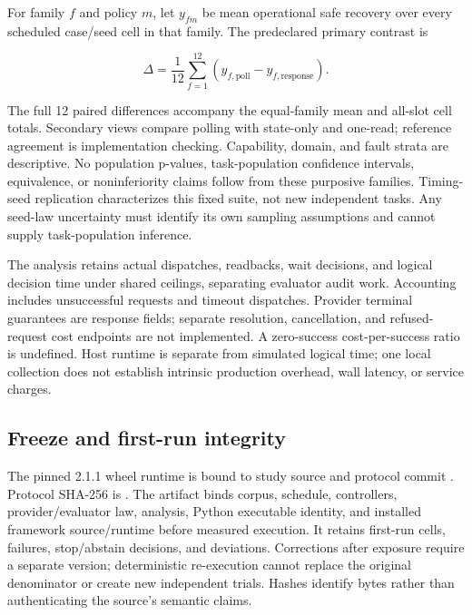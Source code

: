 \documentclass[conference]{IEEEtran}
\begin{document}
For family $f$ and policy $m$, let $y_{fm}$ be mean operational safe recovery over every scheduled case/seed cell in that family. The predeclared primary contrast is

\begin{equation}
\Delta = \frac{1}{12}\sum_{f=1}^{12}
  (y_{f,\mathrm{poll}}-y_{f,\mathrm{response}}).
\end{equation}

The full 12 paired differences accompany the equal-family mean and all-slot cell totals. Secondary views compare polling with state-only and one-read; reference agreement is implementation checking. Capability, domain, and fault strata are descriptive. No population p-values, task-population confidence intervals, equivalence, or noninferiority claims follow from these purposive families. Timing-seed replication characterizes this fixed suite, not new independent tasks. Any seed-law uncertainty must identify its own sampling assumptions and cannot supply task-population inference.

The analysis retains actual dispatches, readbacks, wait decisions, and logical decision time under shared ceilings, separating evaluator audit work. Accounting includes unsuccessful requests and timeout dispatches. Provider terminal guarantees are response fields; separate resolution, cancellation, and refused-request cost endpoints are not implemented. A zero-success cost-per-success ratio is undefined. Host runtime is separate from simulated logical time; one local collection does not establish intrinsic production overhead, wall latency, or service charges.

\subsection{Freeze and first-run integrity}

The pinned 2.1.1 wheel runtime is bound to study source \texttt{} and protocol commit \texttt{}. Protocol SHA-256 is \texttt{}. The artifact binds corpus, schedule, controllers, provider/evaluator law, analysis, Python executable identity, and installed framework source/runtime before measured execution. It retains first-run cells, failures, stop/abstain decisions, and deviations. Corrections after exposure require a separate version; deterministic re-execution cannot replace the original denominator or create new independent trials. Hashes identify bytes rather than authenticating the source's semantic claims.
\end{document}

